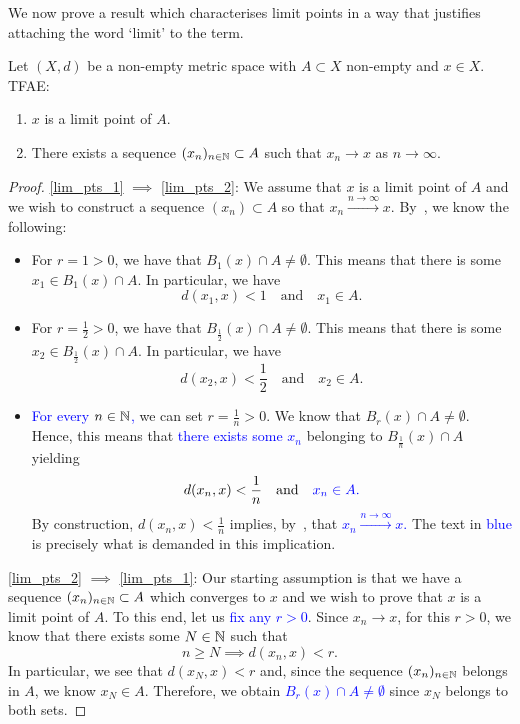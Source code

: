 We now prove a result which characterises limit points in a way that justifies attaching the word `limit' to the term.
\begin{lemma}
\label{lem:lim_pts}
Let $(X,d)$ be a non-empty metric space with $A\subset X$ non-empty and $x\in X$. TFAE:
\begin{enumerate}
	\item \label{lim_pts_1}$x$ is a limit point of $A$.
	\item \label{lim_pts_2}There exists a sequence $(x_n)_{n\in\mathbb{N}}\subset A$ such that $x_n \to x$ as $n\to \infty$.
\end{enumerate}
\end{lemma}
\begin{proof}
	\ref{lim_pts_1} $\implies$ \ref{lim_pts_2}: We assume that $x$ is a limit point of $A$ and we wish to construct a sequence $(x_n)\subset A$ so that $x_n \overset{n\to \infty}{\to} x$. By~, we know the following:
	\begin{itemize}
		\item For $r=1>0$, we have that $B_1(x)\cap A\neq \emptyset$. This means that there is some $x_1 \in B_1(x)\cap A$. In particular, we have
		\[
		d(x_1,x) <1\quad\text{and}\quad x_1 \in A.
		\]
		\item For $r = \frac{1}{2}>0$, we have that $B_\frac{1}{2}(x)\cap A \neq \emptyset$. This means that there is some $x_2 \in B_\frac{1}{2}(x)\cap A$. In particular, we have
		\[
		d(x_2,x) < \frac{1}{2}\quad\text{and}\quad x_2\in A.
		\]
		\item \textcolor{blue}{For every $n\in\mathbb{N}$,} we can set $r = \frac{1}{n}>0$. We know that $B_r(x)\cap A \neq \emptyset$. Hence, this means that \textcolor{blue}{there exists some $x_n$} belonging to $B_\frac{1}{n}(x)\cap A$ yielding
		\[
		d(x_n,x)<\frac{1}{n}\quad\text{and}\quad\textcolor{blue}{x_n \in A.}
		\]
		By construction, $d(x_n,x)<\frac{1}{n}$ implies, by~, that \textcolor{blue}{$x_n \overset{n\to \infty}{\to} x$.} The text in \textcolor{blue}{blue} is precisely what is demanded in this implication.
	\end{itemize}
	\ref{lim_pts_2} $\implies$ \ref{lim_pts_1}: Our starting assumption is that we have a sequence $(x_n)_{n\in\mathbb{N}}\subset A$ which converges to $x$ and we wish to prove that $x$ is a limit point of $A$. To this end, let us \textcolor{blue}{fix any $r>0$}. Since $x_n\to x$, for this $r>0$, we know that there exists some $N\in\mathbb{N}$ such that
	\[
	n\ge N \implies d(x_n,x)<r.
	\]
	In particular, we see that $d(x_N,x)<r$ and, since the sequence $(x_n)_{n\in\mathbb{N}}$ belongs in $A$, we know $x_N \in A$. Therefore, we obtain \textcolor{blue}{$B_r(x)\cap A \neq \emptyset$} since $x_N$ belongs to both sets.
\end{proof}
